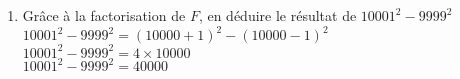 \begin{corrige}
\begin{enumerate}
\begin{itemize}
       \end{itemize}
       \vspace*{-7mm}
       \item Grâce à la factorisation de $F$, en déduire le résultat de $\num{10001}^2-\num{9999}^2$\\
       {\red 
       $\num{10001}^2-\num{9999}^2 = (\num{10000}+1)^2-(\num{10000}-1)^2$\\
       $\num{10001}^2-\num{9999}^2 = 4\times \num{10000}$\\
       $\num{10001}^2-\num{9999}^2 = \num{40000}$\\
       }
    \end{enumerate}
\end{corrige}

